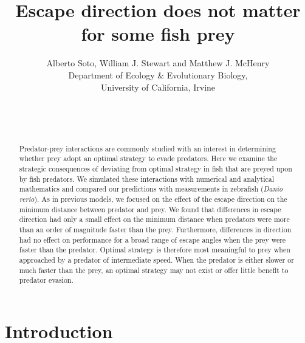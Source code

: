 \documentclass[12pt]{article}
\title{Escape direction does not matter for some fish prey}
\author{Alberto Soto, William J. Stewart and Matthew J. McHenry\\
  Department of Ecology \& Evolutionary Biology,\\
  University of California, Irvine\\ \\ \\ \\}
\begin{document}

\maketitle

\pagebreak


\begin{abstract}

Predator-prey interactions are commonly studied with an interest in determining whether prey adopt an optimal strategy to evade predators. Here we examine the strategic consequences of deviating from optimal strategy in fish that are preyed upon by fish predators. 
We simulated these interactions with numerical and analytical mathematics and compared our predictions with measurements in zebrafish (\textit{Danio rerio}). As in previous models, we focused on the effect of the escape direction on the minimum distance between predator and prey.
We found that differences in escape direction had only a small effect on the minimum distance when predators were more than an order of magnitude faster than the prey. Furthermore, differences in direction had no effect on performance for a broad range of escape angles when the prey were faster than the predator. 
Optimal strategy is therefore most meaningful to prey when approached by a predator of intermediate speed.
When the predator is either slower or much faster than the prey, an optimal strategy may not exist or offer little benefit to predator evasion. 

\end{abstract}

\pagebreak



\section{Introduction}
\label{intro}
\end{document}
